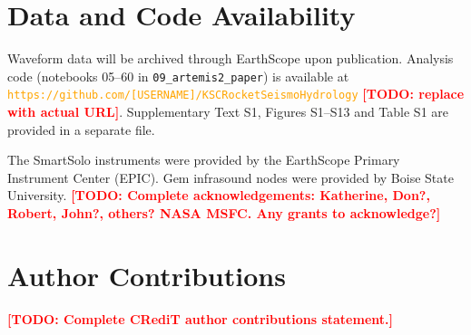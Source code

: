 \documentclass[]{seismica}
\newcommand{\todo}[1]{\textcolor{red}{\textbf{[TODO: #1]}}}
\begin{document}
\section*{Data and Code Availability}

Waveform data will be archived through EarthScope upon publication.
Analysis code (notebooks 05--60 in \texttt{09\_artemis2\_paper}) is
available at
\textcolor{orange}{\texttt{https://github.com/[USERNAME]/KSCRocketSeismoHydrology}} \todo{replace with actual URL}.
Supplementary Text S1, Figures S1--S13 and Table S1 are provided in a separate file.

\begin{acknowledgements}
The SmartSolo instruments were provided by the EarthScope Primary
Instrument Center (EPIC). Gem infrasound nodes were provided by Boise
State University. \todo{Complete acknowledgements: Katherine, Don?,
Robert, John?, others? NASA MSFC. Any grants to acknowledge?}
\end{acknowledgements}

\section*{Author Contributions}

\todo{Complete CRediT author contributions statement.}

\end{document}
